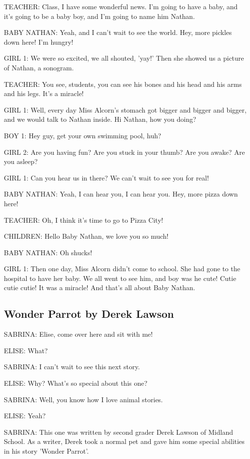 TEACHER:
Class, I have some wonderful news.
I'm going to have a baby, and it's going to be a baby boy, and I'm going to name him Nathan.

BABY NATHAN:
Yeah, and I can't wait to see the world.
Hey, more pickles down here!
I'm hungry!

GIRL 1:
We were so excited, we all shouted, 'yay!'
Then she showed us a picture of Nathan, a sonogram.

TEACHER:
You see, students, you can see his bones and his head and his arms and his legs.
It's a miracle!

GIRL 1:
Well, every day Miss Alcorn's stomach got bigger and bigger and bigger, and we would talk to Nathan inside.
Hi Nathan, how you doing?

BOY 1:
Hey guy, get your own swimming pool, huh?

GIRL 2:
Are you having fun?
Are you stuck in your thumb?
Are you awake?
Are you asleep?

GIRL 1:
Can you hear us in there?
We can't wait to see you for real!

BABY NATHAN:
Yeah, I can hear you, I can hear you.
Hey, more pizza down here!

TEACHER:
Oh, I think it's time to go to Pizza City!

CHILDREN:
Hello Baby Nathan, we love you so much!

BABY NATHAN:
Oh shucks!

GIRL 1:
Then one day, Miss Alcorn didn't come to school.
She had gone to the hospital to have her baby.
We all went to see him, and boy was he cute!
Cutie cutie cutie!
It was a miracle!
And that's all about Baby Nathan.

\subsection{Wonder Parrot by Derek Lawson}

SABRINA:
Elise, come over here and sit with me!

ELISE:
What?

SABRINA:
I can't wait to see this next story.

ELISE:
Why?
What's so special about this one?

SABRINA:
Well, you know how I love animal stories.

ELISE:
Yeah?

SABRINA:
This one was written by second grader Derek Lawson of Midland School.
As a writer, Derek took a normal pet and gave him some special abilities in his story 'Wonder Parrot'.

